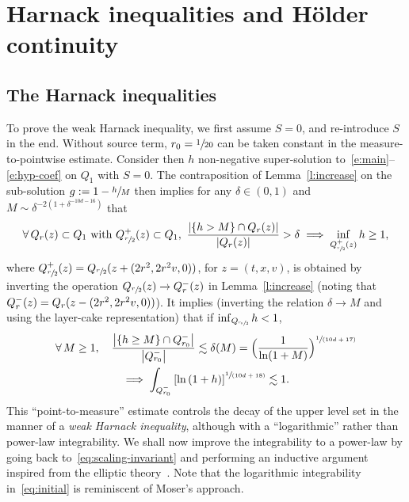 \documentclass[10pt]{amsart}
\newcommand{\spfrac}[2]{\sfrac{#1}{(#2)}}
\theoremstyle{definition}
\theoremstyle{remark}
\begin{document}
\section{Harnack inequalities and Hölder continuity}
\label{sec:Harnack}

\subsection{The Harnack inequalities}

To prove the weak Harnack inequality, we first assume $S=0$, and
re-introduce $S$ in the end. Without source term,
$r_0=\sfrac{1}{20}$ can be taken constant in the
measure-to-pointwise estimate. Consider then $h$ non-negative
super-solution to~\eqref{e:main}--\eqref{e:hyp-coef} on $Q_1$ with
$S=0$. The contraposition of Lemma~\ref{l:increase} on the
sub-solution $g := 1 - \sfrac{h}{M}$ then implies for any
$\delta \in (0,1)$ and $M \sim \delta^{-2 (1+\delta^{-10d-16})}$
that
\begin{equation}
\label{eq:scaling-invariant}
\forall \, Q_r(z) \subset Q_1 \text{ with }
Q_{\sfrac{r}{2}}^{+}(z) \subset Q_1, \
\frac{\left| \{ h > M \} \cap Q_{r}(z) \right|}{\left|
Q_{r}(z) \right|} > \delta \implies \inf_{Q_{\sfrac{r}{2}}^+(z)} h \ge 1,
\end{equation}
where
$Q_{\sfrac{r}{2}}^{+}(z) = Q_{\sfrac{r}{2}}(z +(2r^2,2r^2v,0))$,
for $z=(t,x,v)$, is obtained by inverting the operation
$Q_{\sfrac{r}{2}}(z) \to Q_{r}^-(z)$ in Lemma~\ref{l:increase}
(noting that $Q_r^-(z)=Q_r(z-\nobreak(2r^2,2r^2v,0))$). It implies
(inverting the relation $\delta \to M$ and using the layer-cake
representation) that if $\inf_{Q_{\sfrac{r_0}{2}}} h <1$,
\begin{multline}
\label{eq:initial}
\forall \, M \ge 1, \quad \frac{\left| \{ h \ge M \} \cap
Q_{r_0}^- \right|}{\left|Q_{r_0}^- \right|} \lesssim
\delta(M) =\Bigl( \frac{1}{ \ln (1+M)}
\Bigr)^{\spfrac{1}{10d+17}} \\
\implies
\int_{Q_{r_0}^- } \left[ \ln \left( 1+ h \right)
\right]^{\spfrac{1}{10d+18}} \lesssim 1.
\end{multline}
This ``point-to-measure'' estimate controls the decay of the
upper level set in the manner of a \emph{weak Harnack
inequality}, although with a ``logarithmic'' rather than
power-law integrability. We shall now improve the integrability
to a power-law by going back to~\eqref{eq:scaling-invariant} and
performing an inductive argument inspired from the elliptic
theory~\cite{MR3565366}. Note that the logarithmic integrability
in~\eqref{eq:initial} is reminiscent of Moser's approach.
\end{document}

